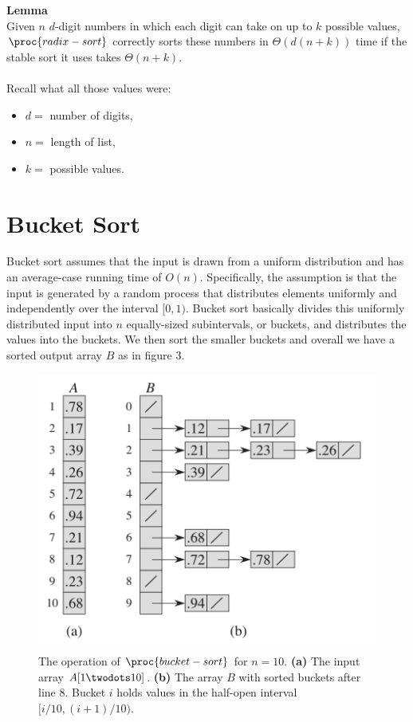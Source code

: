 \documentclass{article}
\begin{document}
\textbf{Lemma} \\
Given $n$ $d$-digit numbers in which each digit can take on up to $k$ possible values, $\proc{radix-sort}$ correctly sorts these numbers in $\Theta{(d(n + k))}$ time if the stable sort it uses takes $\Theta{(n + k)}$.
\\ \\
Recall what all those values were:\\
\begin{itemize}
    \item[] $d=$ number of digits,
    \item[] $n=$ length of list,
    \item[] $k=$ possible values.
\end{itemize}


\newpage

\section*{Bucket Sort}
Bucket sort assumes that the input is drawn from a uniform distribution and has an average-case running time of $O(n)$. Specifically, the assumption is that the input is generated by a random process that distributes elements uniformly and independently over the interval $[0, 1)$. Bucket sort basically divides this uniformly distributed input into $n$ equally-sized subintervals, or buckets, and distributes the values into the buckets. We then sort the smaller buckets and overall we have a sorted output array $B$ as in figure 3.

\begin{figure}[!ht]
\includegraphics[scale=0.3]{bucket_sort}
\caption{
    The operation of $\proc{bucket-sort}$ for $n=10$. 
    \textbf{(a)} The input array $A[1 \twodots 10]$.
    \textbf{(b)} The array $B$ with sorted buckets after line 8. Bucket $i$ holds values in the half-open interval $[i/10, (i+1)/10)$.
}
\label{fig:linear_bs}
\end{figure}
\end{document}

